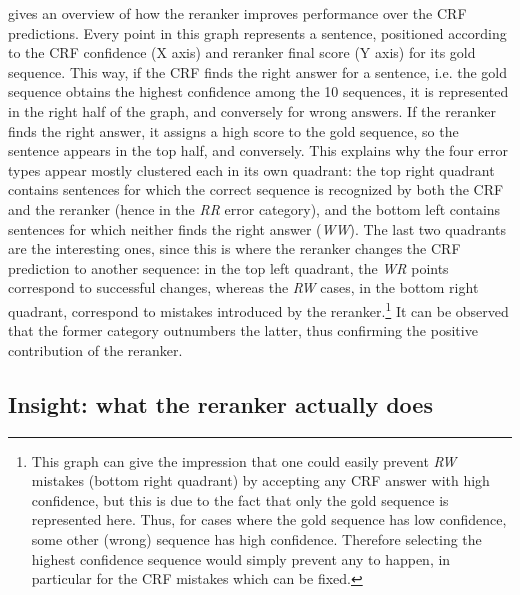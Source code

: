\documentclass[output=paper,modfonts,nonflat]{langsci/langscibook}
\begin{document}



 gives an overview of how
the reranker improves performance over the CRF predictions. Every
point in this graph represents a sentence, positioned according to the
CRF confidence (X axis) and reranker final score (Y axis) for its gold
sequence. This way, if the CRF finds the right answer for a sentence,
i.e. the gold sequence obtains the highest confidence among the 10
sequences, it is represented in the right half of the graph, and
conversely for wrong answers. If the reranker finds the right answer,
it assigns a high score to the gold sequence, so the sentence appears
in the top half, and conversely. This explains why the four error
types appear mostly clustered each in its own quadrant: the top right
quadrant contains sentences for which the correct sequence is
recognized by both the CRF and the reranker (hence in the {\it RR}
error category), and the bottom left contains sentences for which
neither finds the right answer ({\it WW}). The last two quadrants are
the interesting ones, since this is where the reranker changes the CRF
prediction to another sequence: in the top left quadrant, the {\it WR} points
correspond to successful changes, whereas the {\it RW} cases, in the
bottom right quadrant, correspond to mistakes introduced by the
reranker.\footnote{This graph can give the impression that one could
  easily prevent {\it RW} mistakes (bottom right quadrant) by
  accepting any CRF answer with high confidence, but this is due to
  the fact that only the gold sequence is represented here. Thus, for
  cases where the gold sequence has low confidence, some other (wrong)
  sequence has high confidence. Therefore selecting the highest
  confidence sequence would simply prevent any  to happen, in
  particular for the CRF mistakes which can be fixed.} It can be
observed that the former category outnumbers the latter, thus
confirming the positive contribution of the reranker.





\subsection{Insight: what the reranker actually does}
\end{document}
